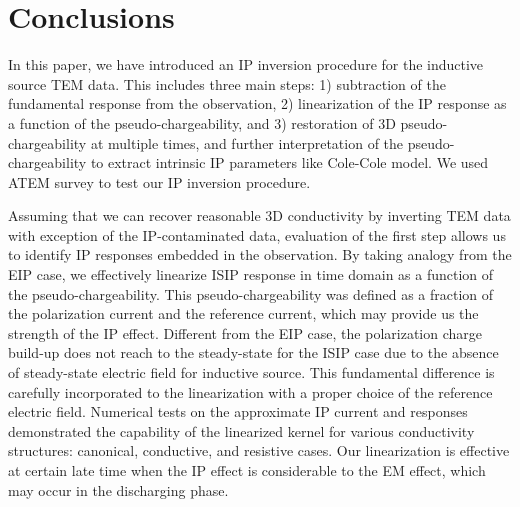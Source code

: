 \documentclass[a4paper, 11pt]{article}
\begin{document}
\section{Conclusions}
In this paper, we have introduced an IP inversion procedure for the inductive source TEM data. 
This includes three main steps: 1) subtraction of the fundamental response from the observation, 2) linearization of the IP response as a function of the pseudo-chargeability, and 3) restoration of 3D pseudo-chargeability at multiple times, and further interpretation of the pseudo-chargeability to extract intrinsic IP parameters like Cole-Cole model. We used ATEM survey to test our IP inversion procedure.

Assuming that we can recover reasonable 3D conductivity by inverting TEM data with exception of the IP-contaminated data, evaluation of the first step allows us to identify IP responses embedded in the observation. 
By taking analogy from the EIP case, we effectively linearize ISIP response in time domain as a function of the pseudo-chargeability. 
This pseudo-chargeability was defined as a fraction of the polarization current and the reference current, which may provide us the strength of the IP effect. 
Different from the EIP case, the polarization charge build-up does not reach to the steady-state for the ISIP case due to the absence of steady-state electric field for inductive source. 
This fundamental difference is carefully incorporated to the linearization with a proper choice of the reference electric field. 
Numerical tests on the approximate IP current and responses demonstrated the capability of the linearized kernel for various conductivity structures: canonical, conductive, and resistive cases. 
Our linearization is effective at certain late time when the IP effect is considerable to the EM effect, which may occur in the discharging phase. 
\end{document}
